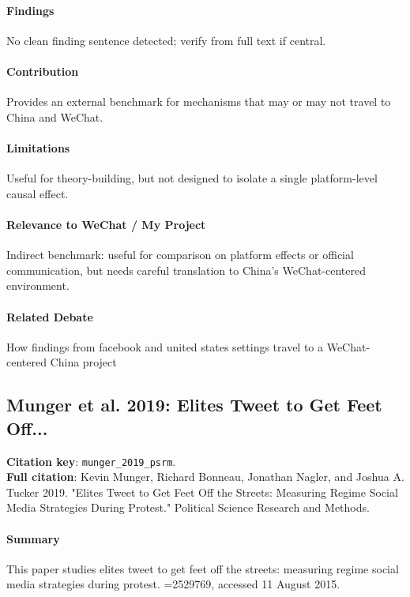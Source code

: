 \documentclass[12pt]{article}
\begin{document}
\paragraph{Findings} No clean finding sentence detected; verify from full text if central.

\paragraph{Contribution} Provides an external benchmark for mechanisms that may or may not travel to China and WeChat.

\paragraph{Limitations} Useful for theory-building, but not designed to isolate a single platform-level causal effect.

\paragraph{Relevance to WeChat / My Project} Indirect benchmark: useful for comparison on platform effects or official communication, but needs careful translation to China's WeChat-centered environment.

\paragraph{Related Debate} How findings from facebook and united states settings travel to a WeChat-centered China project


\subsection{Munger et al. 2019: Elites Tweet to Get Feet Off...}
\textbf{Citation key}: \texttt{munger\_2019\_psrm}.\\
\textbf{Full citation}: Kevin Munger, Richard Bonneau, Jonathan Nagler, and Joshua A. Tucker 2019. "Elites Tweet to Get Feet Off the Streets: Measuring Regime Social Media Strategies During Protest." Political Science Research and Methods.

\paragraph{Summary} This paper studies elites tweet to get feet off the streets: measuring regime social media strategies during protest. =2529769, accessed 11 August 2015.
\end{document}
